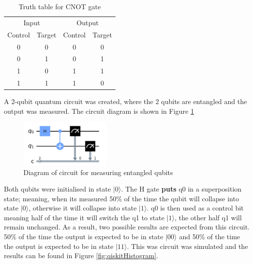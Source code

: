 \begin{table}[h]
\centering
\begin{tabular}{cccc}
\multicolumn{2}{c}{Input}                         & \multicolumn{2}{c}{Output}   \\ 
\multicolumn{1}{c|}{Control} & \multicolumn{1}{c||}{Target} & \multicolumn{1}{c|}{Control} & Target \\ \hline\hline
\multicolumn{1}{c|}{0}  & \multicolumn{1}{c||}{0}  & \multicolumn{1}{c|}{0}  & 0  \\ \hline
\multicolumn{1}{c|}{0}  & \multicolumn{1}{c||}{1}  & \multicolumn{1}{c|}{0}  & 1  \\ \hline
\multicolumn{1}{c|}{1}  & \multicolumn{1}{c||}{0}  & \multicolumn{1}{c|}{1}  & 1  \\ \hline
\multicolumn{1}{c|}{1}  & \multicolumn{1}{c||}{1}  & \multicolumn{1}{c|}{1}  & 0 
\end{tabular}
\label{tab:cNotTruth}
\caption{Truth table for CNOT gate}
\end{table}




A 2-qubit quantum circuit was created, where the 2 qubits are entangled and the output was measured. The circuit diagram is shown in Figure \ref{fig:entangleMeasure}

\begin{figure}[h]
    \centering
    \includegraphics[width=0.4\textwidth]{lab2/images/entangleMeasure.png}
    \caption{Diagram of circuit for measuring entangled qubits} 
    \label{fig:entangleMeasure}
\end{figure}

Both qubits were initialised in state $|0\rangle$. The H gate \textbf{puts} q0 in a superposition state; meaning, when its measured 50\% of the time the qubit will collapse into state $|0\rangle$, otherwise it will collapse into state $|1\rangle$. q0 is then used as a control bit meaning half of the time it will switch the q1 to state $|1\rangle$, the other half q1 will remain unchanged. As a result, two possible results are expected from this circuit. 50\% of the time the output is expected to be in state $|00\rangle$ and 50\% of the time the output is expected to be in state $|11\rangle$. This was circuit was simulated and the results can be found in Figure \ref{fig:qiskitHistogram}.

